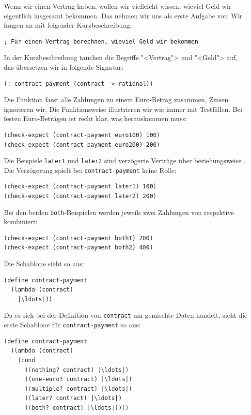 Wenn wir einen Vertrag haben, wollen wir vielleicht wissen, wieviel
Geld wir eigentlich insgesamt bekommen.  Das nehmen wir uns als erste
Aufgabe vor.  Wir fangen an mit folgender Kurzbeschreibung:
%
\begin{lstlisting}
; Für einen Vertrag berechnen, wieviel Geld wir bekommen
\end{lstlisting}
%
In der Kurzbeschreibung tauchen die Begriffe "<Vertrag"> und "<Geld">
auf, das übersetzen wir in folgende Signatur:
%
\begin{lstlisting}
(: contract-payment (contract -> rational))
\end{lstlisting}
%
Die Funktion fasst alle Zahlungen zu einem Euro-Betrag zusammen,
Zinsen ignorieren wir.  Die Funktionsweise illustrieren wir wie immer
mit Testfällen.  Bei festen Euro-Beträgen ist recht klar, was
herauskommen muss:
%
\begin{lstlisting}
(check-expect (contract-payment euro100) 100)
(check-expect (contract-payment euro200) 200)
\end{lstlisting}
%
Die Beispiele \lstinline{later1} und \lstinline{later2} sind
verzögerte Verträge über  beziehungsweise .  Die
Verzögerung spielt bei \lstinline{contract-payment} keine Rolle:
%
\begin{lstlisting}
(check-expect (contract-payment later1) 100)
(check-expect (contract-payment later2) 200)
\end{lstlisting}
%
Bei den beiden \lstinline{both}-Beispielen werden jeweils zwei
Zahlungen von  respektive  kombiniert:
%
\begin{lstlisting}
(check-expect (contract-payment both1) 200)
(check-expect (contract-payment both2) 400)
\end{lstlisting}
%
Die Schablone sieht so aus:
%
\begin{lstlisting}
(define contract-payment
  (lambda (contract)
    |\ldots|))
\end{lstlisting}
%
Da es sich bei der Definition von \lstinline{contract} um gemischte
Daten handelt, sieht die erste Schablone für
\lstinline{contract-payment} so aus:
%
\begin{lstlisting}
(define contract-payment
  (lambda (contract)
    (cond
      ((nothing? contract) |\ldots|)
      ((one-euro? contract) |\ldots|)
      ((multiple? contract) |\ldots|)
      ((later? contract) |\ldots|)
      ((both? contract) |\ldots|))))
\end{lstlisting}
